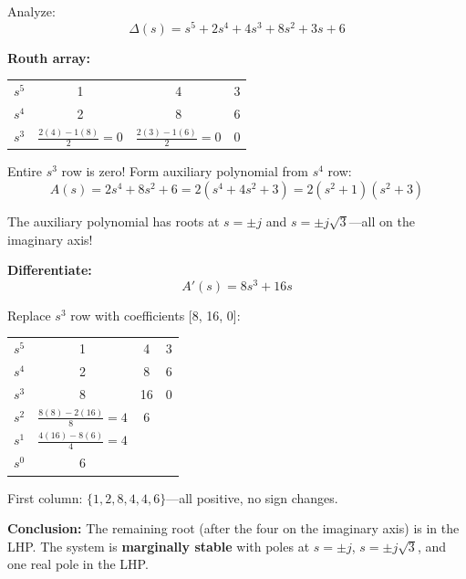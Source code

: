 \begin{example}
\label{ex:auxiliary_poly}
Analyze:
\begin{equation}
\Delta(s) = s^5 + 2s^4 + 4s^3 + 8s^2 + 3s + 6
\end{equation}

\textbf{Routh array:}
\begin{center}
\begin{tabular}{c|ccc}
$s^5$ & 1 & 4 & 3 \\
$s^4$ & 2 & 8 & 6 \\
$s^3$ & $\frac{2(4)-1(8)}{2} = 0$ & $\frac{2(3)-1(6)}{2} = 0$ & 0 \\
\end{tabular}
\end{center}

Entire $s^3$ row is zero! Form auxiliary polynomial from $s^4$ row:
\begin{equation}
A(s) = 2s^4 + 8s^2 + 6 = 2(s^4 + 4s^2 + 3) = 2(s^2 + 1)(s^2 + 3)
\end{equation}

The auxiliary polynomial has roots at $s = \pm j$ and $s = \pm j\sqrt{3}$---all on the imaginary axis!

\textbf{Differentiate:}
\begin{equation}
A'(s) = 8s^3 + 16s
\end{equation}

Replace $s^3$ row with coefficients [8, 16, 0]:

\begin{center}
\begin{tabular}{c|ccc}
$s^5$ & 1 & 4 & 3 \\
$s^4$ & 2 & 8 & 6 \\
$s^3$ & 8 & 16 & 0 \\
$s^2$ & $\frac{8(8)-2(16)}{8} = 4$ & 6 & \\
$s^1$ & $\frac{4(16)-8(6)}{4} = 4$ & & \\
$s^0$ & 6 & &
\end{tabular}
\end{center}

First column: $\{1, 2, 8, 4, 4, 6\}$---all positive, no sign changes.

\textbf{Conclusion:} The remaining root (after the four on the imaginary axis) is in the LHP. The system is \textbf{marginally stable} with poles at $s = \pm j$, $s = \pm j\sqrt{3}$, and one real pole in the LHP.
\end{example}

